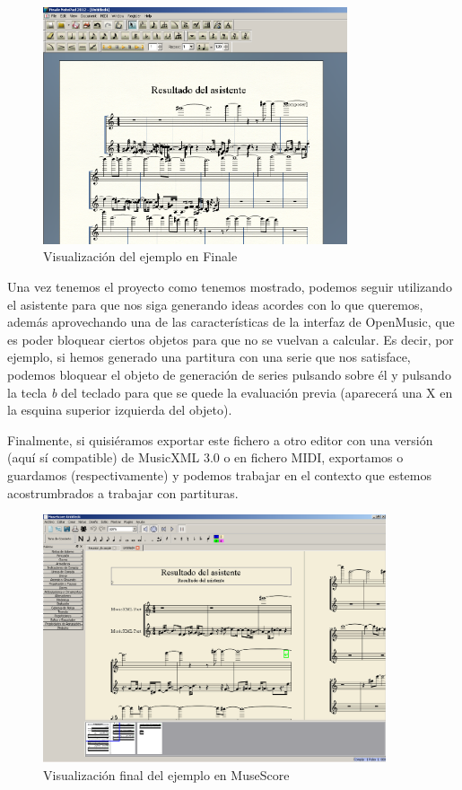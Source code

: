 \documentclass[a4paper,openany,oneside,12pt]{book}
\begin{document}
\begin{figure}
\centering
\includegraphics[width=0.8\textwidth]{img/finale.png}
\caption{Visualización del ejemplo en Finale} \label{fig:finale}
\end{figure}

Una vez tenemos el proyecto como tenemos mostrado, podemos seguir utilizando el asistente para que nos siga generando ideas acordes con lo que queremos, además aprovechando una de las características de la interfaz de OpenMusic, que es poder bloquear ciertos objetos para que no se vuelvan a calcular. Es decir, por ejemplo, si hemos generado una partitura con una serie que nos satisface, podemos bloquear el objeto de generación de series pulsando sobre él y pulsando la tecla \emph{b} del teclado para que se quede la evaluación previa (aparecerá una X en la esquina superior izquierda del objeto).

Finalmente, si quisiéramos exportar este fichero a otro editor con una versión (aquí sí compatible) de MusicXML 3.0 o en fichero MIDI, exportamos o guardamos (respectivamente) y podemos trabajar en el contexto que estemos acostrumbrados a trabajar con partituras.


\begin{figure}
\centering
\includegraphics[width=0.9\textwidth]{img/musescore.png}
\caption{Visualización final del ejemplo en MuseScore} \label{fig:musescore}
\end{figure}
\end{document}
